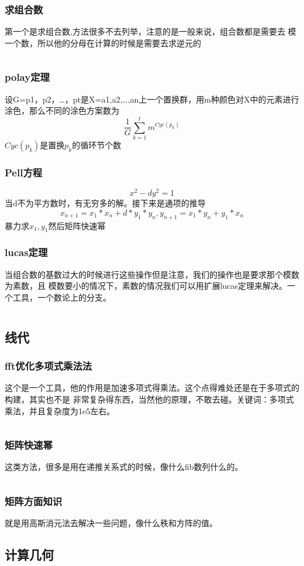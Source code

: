 \documentclass[a4paper,11pt]{article}
\begin{document}
\begin{CJK}{UTF8}{gbsn}
\subsubsection{求组合数}
第一个是求组合数,方法很多不去列举，注意的是一般来说，组合数都是需要去
模一个数，所以他的分母在计算的时候是需要去求逆元的
\inputminted{c++}{../scoure/math/zuhe.cpp}
\subsubsection{polay定理}
设G={p1，p2，…，pt}是X={a1,a2,…,an}上一个置换群，用m种颜色对X中的元素进行涂色，那么不同的涂色方案数为
$$\frac{1}{G}\sum_{k=1}^t m^{Cyc(p_k)}$$
$Cyc(p_k)$是置换$p_k$的循环节个数
\subsubsection{Pell方程}
$$x^2-dy^2=1$$
当d不为平方数时，有无穷多的解。接下来是通项的推导
$$ x_{n+1} = x_1*x_n+d*y_1*y_n,y_{n+1} = x_1*y_n + y_1*x_n $$
暴力求$x_1,y_1$然后矩阵快速幂
\subsubsection{lucas定理}
当组合数的基数过大的时候进行这些操作但是注意，我们的操作也是要求那个模数为素数，且
模数要小的情况下，素数的情况我们可以用扩展lucas定理来解决。一个工具，一个数论上的分支。
\inputminted{c++}{../scoure/math/lucas.cpp}
\subsection{线代}
\subsubsection{fft优化多项式乘法法}
这个是一个工具，他的作用是加速多项式得乘法。这个点得难处还是在于多项式的构建，其实也不是
非常复杂得东西，当然他的原理，不敢去碰。关键词：多项式乘法，并且复杂度为1e5左右。
\inputminted{c++}{../scoure/math/fft.cpp}
\subsubsection{矩阵快速幂}
这类方法，很多是用在递推关系式的时候，像什么fib数列什么的。
\inputminted{c++}{../scoure/math/ju_quick.cpp}
\subsubsection{矩阵方面知识}
就是用高斯消元法去解决一些问题，像什么秩和方阵的值。
\subsection{计算几何}

\end{CJK}
\end{document}
